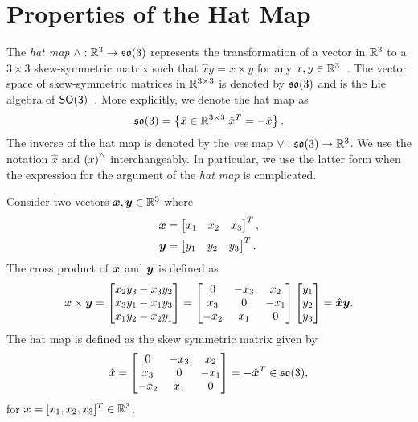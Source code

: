 
\chapter{Properties of the Hat Map}\label{chap:hat_map}


The \textit{hat map} $\wedge :\mathbb{R}^{3}\rightarrow\mathfrak{so}(3)$ represents the transformation of a vector in $\mathbb{R}^{3}$ to a $3\times 3$ skew-symmetric matrix such that $\hat x y = x\times y$ for any $x,y\in\mathbb{R}^{3}$~\cite{bullo2004}. 
The vector space of skew-symmetric matrices in \( \mathbb{R}^{3 \times 3 } \) is denoted by \( \mathfrak{so}(3) \) and is the Lie algebra of \( \mathsf{SO(3)} \)~\cite{hall2015}.
More explicitly, we denote the hat map as
\begin{align*}
    \mathfrak{so}(3) = \left\{  \hat x \in \mathbb{R}^{3 \times 3} | \hat x^T = - \hat x  \right\}.
\end{align*}
The inverse of the hat map is denoted by the \textit{vee} map $\vee:\mathfrak{so}(3)\rightarrow\mathbb{R}^{3}$. 
We use the notation \( \hat{x}\) and \( \left( x \right)^\wedge\) interchangeably.
In particular, we use the latter form when the expression for the argument of the \textit{hat map} is complicated. 

Consider two vectors \( \bm{x}, \bm{y} \in \mathbb{R}^3\) where
\begin{align*}
    \bm{x} &= \begin{bmatrix} x_1 & x_2 & x_3 \end{bmatrix}^T , \\
    \bm{y} &= \begin{bmatrix} y_1 & y_2 & y_3 \end{bmatrix}^T .
\end{align*}
The cross product of \( \bm{x} \) and \( \bm{y} \) is defined as
\begin{align}
    \bm{x} \times \bm{y} = 
    \begin{bmatrix} 
        x_2 y_3 - x_3 y_2 \\
        x_3 y_1 - x_1 y_3 \\
        x_1 y_2 - x_2 y_1 
    \end{bmatrix}
    = 
    \begin{bmatrix} 0 & -x_3 & x_2 \\ x_3 & 0 & -x_1 \\ -x_2 & x_1 & 0\end{bmatrix}
    \begin{bmatrix} y_1 \\ y_2 \\ y_3 \end{bmatrix}
    = \hat{\bm{x}} \bm{y}.
\end{align}
The hat map is defined as the skew symmetric matrix given by
\begin{align}
    \hat x = \begin{bmatrix} 0 & -x_3 & x_2 \\ x_3 & 0 & -x_1 \\ -x_2 & x_1 & 0\end{bmatrix} 
    = - \hat{\bm{x}}^T \in \mathfrak{so}(3) ,
\end{align}
for $\bm{x}=[x_1,x_2,x_3]^T\in\mathbb{R}^{3}$. 

